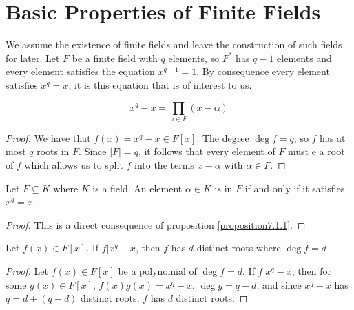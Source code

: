 
\section{Basic Properties of Finite Fields}

We assume the existence of finite fields and leave the construction of such fields for later. Let $F$ be a finite field with $q$ elements, so $F^*$ has $q-1$ elements and every element satisfies the equation $x^{q-1}=1$. By consequence every element satisfies $x^q=x$, it is this equation that is of interest to us.

\begin{proposition}\label{proposition7.1.1}
    \begin{equation*}
        x^q-x = \prod_{a \in F} (x-\alpha)
    \end{equation*}
\end{proposition}
\begin{proof}
    We have that $f(x)=x^q-x \in F[x]$. The degree $\deg{f}=q$, so $f$ has at most $q$ roots in $F$. Since $|F|=q$, it follows that every element of $F$ must e a root of $f$ which allows us to split $f$ into the terms $x-\alpha$ with $\alpha \in F$.
\end{proof}

\begin{corollary}
    Let $F \subseteq K$ where $K$ is a field. An element $\alpha \in K$ is in $F$ if and only if it satisfies $x^q=x$.
\end{corollary}
\begin{proof}
    This is a direct consequence of proposition \ref{proposition7.1.1}.
\end{proof}

\begin{corollary}
    Let $f(x) \in F[x]$. If $f|x^q-x$, then $f$ has $d$ distinct roots where $\deg{f}=d$
\end{corollary}
\begin{proof}
    Let $f(x) \in F[x]$ be a polynomial of $\deg{f}=d$. If $f|x^q-x$, then for some $g(x) \in F[x]$, $f(x)g(x)=x^q-x$. $\deg{g}=q-d$, and since $x^q-x$ has $q=d+(q-d)$ distinct roots, $f$ has $d$ distinct roots.
\end{proof}

